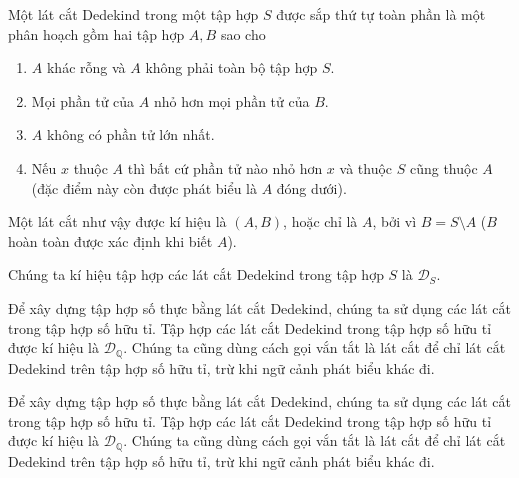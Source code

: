 \begin{definition}
    Một lát cắt Dedekind trong một tập hợp $S$ được sắp thứ tự toàn phần là một phân hoạch gồm hai tập hợp $A, B$ sao cho
    \begin{enumerate}[label={(DC\arabic*)},itemindent=0.5cm]
        \item $A$ khác rỗng và $A$ không phải toàn bộ tập hợp $S$.
        \item Mọi phần tử của $A$ nhỏ hơn mọi phần tử của $B$.
        \item $A$ không có phần tử lớn nhất.
        \item Nếu $x$ thuộc $A$ thì bất cứ phần tử nào nhỏ hơn $x$ và thuộc $S$ cũng thuộc $A$ (đặc điểm này còn được phát biểu là $A$ đóng dưới).
    \end{enumerate}

    Một lát cắt như vậy được kí hiệu là $(A, B)$, hoặc chỉ là $A$, bởi vì $B = S\setminus A$ ($B$ hoàn toàn được xác định khi biết $A$).

    Chúng ta kí hiệu tập hợp các lát cắt Dedekind trong tập hợp $S$ là $\mathscr{D}_{S}$.
\end{definition}

Để xây dựng tập hợp số thực bằng lát cắt Dedekind, chúng ta sử dụng các lát cắt trong tập hợp số hữu tỉ. Tập hợp các lát cắt Dedekind trong tập hợp số hữu tỉ được kí hiệu là $\mathscr{D}_{\mathbb{Q}}$. Chúng ta cũng dùng cách gọi vắn tắt là lát cắt để chỉ lát cắt Dedekind trên tập hợp số hữu tỉ, trừ khi ngữ cảnh phát biểu khác đi.

Để xây dựng tập hợp số thực bằng lát cắt Dedekind, chúng ta sử dụng các lát cắt trong tập hợp số hữu tỉ. Tập hợp các lát cắt Dedekind trong tập hợp số hữu tỉ được kí hiệu là $\mathscr{D}_{\mathbb{Q}}$. Chúng ta cũng dùng cách gọi vắn tắt là lát cắt để chỉ lát cắt Dedekind trên tập hợp số hữu tỉ, trừ khi ngữ cảnh phát biểu khác đi.

